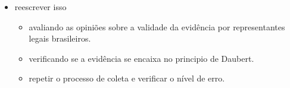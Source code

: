 \documentclass[
	12pt,				%
	openright,			%
	oneside,			%
	a4paper,			%
	english,			%
	french,				%
	spanish,			%
	brazil,				%
	]{abntex2}
\begin{document}
\begin{itemize}
 \item reescrever isso
 
 \begin{itemize}
  \item avaliando as opiniões sobre a validade da evidência por representantes legais brasileiros.
  \item verificando se a evidência se encaixa no principio de Daubert.
  \item repetir o processo de coleta e verificar o nível de erro.
 \end{itemize}

\end{itemize}

\postextual





\printindex
\end{document}
